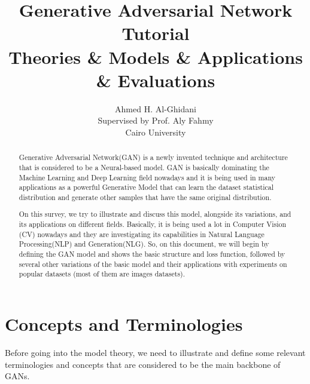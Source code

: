 \documentclass{winnower}
\begin{document}
\title{%
  Generative Adversarial Network Tutorial \\
    \large Theories \& Models \& Applications \& Evaluations}

\author{Ahmed H. Al-Ghidani \\ Supervised by Prof. Aly Fahmy \\ Cairo University}

\maketitle

\date{}

\maketitle

\begin{abstract}
Generative Adversarial Network(GAN) is a newly invented technique and architecture that is considered to be a Neural-based model. GAN is basically dominating the Machine Learning and Deep Learning field nowadays and it is being used in many applications as a powerful Generative Model that can learn the dataset statistical distribution and generate other samples that have the same original distribution. 

On this survey, we try to illustrate and discuss this model, alongside its variations, and its applications on different fields. Basically, it is being used a lot in Computer Vision (CV) nowadays and they are investigating its capabilities in Natural Language Processing(NLP) and Generation(NLG). So, on this document, we will begin by defining the GAN model and shows the basic structure and loss function, followed by several other variations of the basic model and their applications with experiments on popular datasets (most of them are images datasets).
\end{abstract}


\section{Concepts and Terminologies}

Before going into the model theory, we need to illustrate and define some relevant terminologies and concepts that are considered to be the main backbone of GANs.\newline
\end{document}
